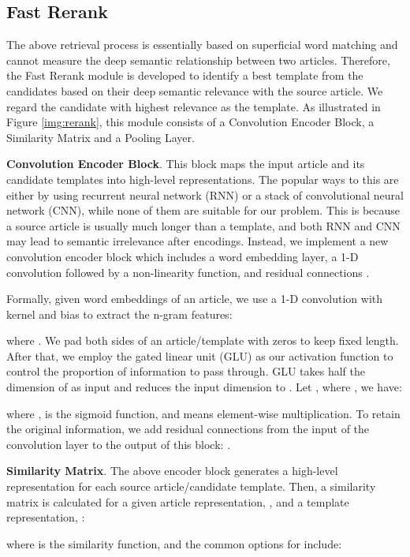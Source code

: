 \documentclass[11pt,a4paper]{article}
\begin{document}
\begin{spacing}{1.0}
\subsection{Fast Rerank}\label{sec:rerank}
The above retrieval process is essentially based on superficial word matching and cannot measure the deep semantic relationship between two articles. Therefore, the Fast Rerank module is developed to identify a best template from the candidates based on their deep semantic relevance with the source article. We regard the candidate with highest relevance as the template. As illustrated in Figure \ref{img:rerank}, this module consists of a Convolution Encoder Block, a Similarity Matrix and a Pooling Layer.

\noindent\textbf{Convolution Encoder Block}. This block maps the input article and its candidate templates into high-level representations. The popular ways to this are either by using recurrent neural network (RNN) or a stack of convolutional neural network (CNN), while none of them are suitable for our problem. This is because a source article is usually much longer than a template, and both RNN and CNN may lead to semantic irrelevance after encodings. Instead, we implement a new convolution encoder block which includes a word embedding layer, a 1-D convolution followed by a non-linearity function, and residual connections \cite{gehring2017convolutional}.

Formally, given word embeddings  of an article, we use a 1-D convolution with kernel  and bias  to extract the n-gram features:

where . We pad both sides of an article/template with zeros to keep fixed length. After that, we employ the gated linear unit (GLU) \cite{dauphin2017language} as our activation function to control the proportion of information to pass through. GLU takes half the dimension of  as input and reduces the input dimension to . Let , where , we have:

where ,  is the sigmoid function, and  means element-wise multiplication. To retain the original information, we add residual connections from the input of the convolution layer to the output of this block: .

\noindent\textbf{Similarity Matrix}. The above encoder block generates a high-level representation for each source article/candidate template. Then, a similarity matrix  is calculated for a given article representation, , and a template representation, :

where  is the similarity function, and the common options for  include:


\end{spacing}
\end{document}
